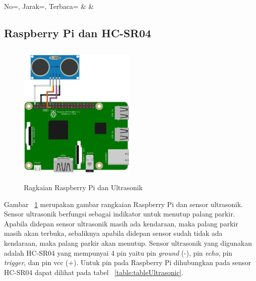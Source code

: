 \begin{atable}
    \caption{Hasil uji jarak baca RFID}
    \label{table:tableUjiRfid}
        {
            No=\No, 
            Jarak=\Jarak,
            Terbaca=\Terbaca}
        {
            \No & 
            \Jarak &
            \Terbaca}
\end{atable}

\subsection{Raspberry Pi dan HC-SR04}
\begin{figure} [H]
    \includegraphics[height=7cm, width=0.5\textwidth, center]{images/skematik_ultra.jpg}
    \caption{Ragkaian Raspberry Pi dan Ultrasonik}
    \label{fig:skematikUltrasonik}
\end{figure}

Gambar ~\ref{fig:skematikUltrasonik} merupakan gambar rangkaian Raspberry Pi dan sensor ultrasonik. Sensor ultrasonik berfungsi sebagai indikator untuk menutup palang parkir. Apabila didepan sensor ultrasonik masih ada kendaraan, maka palang parkir masih akan terbuka, sebaliknya apabila didepan sensor sudah tidak ada kendaraan, maka palang parkir akan menutup. Sensor ultrasonik yang digunakan adalah HC-SR04 yang mempunyai 4 pin yaitu pin \textit{ground} (-), pin \textit{echo}, pin \textit{trigger}, dan pin vcc (+). Untuk pin pada Raspberry Pi dihubungkan pada sensor HC-SR04 dapat dilihat pada tabel ~\ref{table:tableUltrasonic}.\newline

